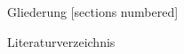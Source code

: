 \documentclass[a4paper]{article}
\begin{document}
\begin{frame}[t]{Gliederung}
    [sections numbered]
    \tableofcontents[hideallsubsections]
\end{frame}


\begin{frame}{Literaturverzeichnis}
    \nocite{*}
    \small
    \printbibliography
\end{frame}
\end{document}
